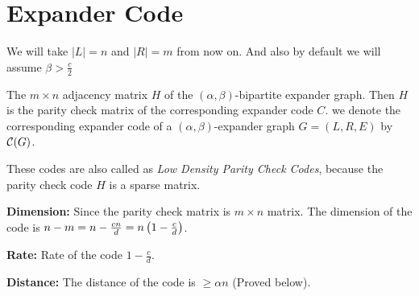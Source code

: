 \section{Expander Code}
We will take $|L|=n$ and $|R|=m$ from now on. And also by default we will assume $\beta> \frac{c}{2}$
\begin{definition}
	The $m\times n$ adjacency matrix $H$ of the $(\alpha,\beta)$-bipartite expander graph. Then $H$ is the parity check matrix of the corresponding expander code $C$. we denote the corresponding expander code of a $(\alpha,\beta)$-expander graph $G=(L,R,E)$ by $\mathcal{C}(G)$.
\end{definition}
\begin{remark}
	These codes are also called as \textit{Low Density Parity Check Codes}, because the parity check code $H$ is a sparse matrix. 
\end{remark}
\parinf
\textbf{Dimension:}  Since the parity check matrix is $m\times n$ matrix. The dimension of the code is $n-m=n-\frac{cn}{d}=n\left(1-\frac{c}{d}\right)$.

\textbf{Rate:} Rate of the code $1-\frac{c}{d}$.

\textbf{Distance:} The distance of the code is $\geq \alpha n$ (Proved below).\parinn

